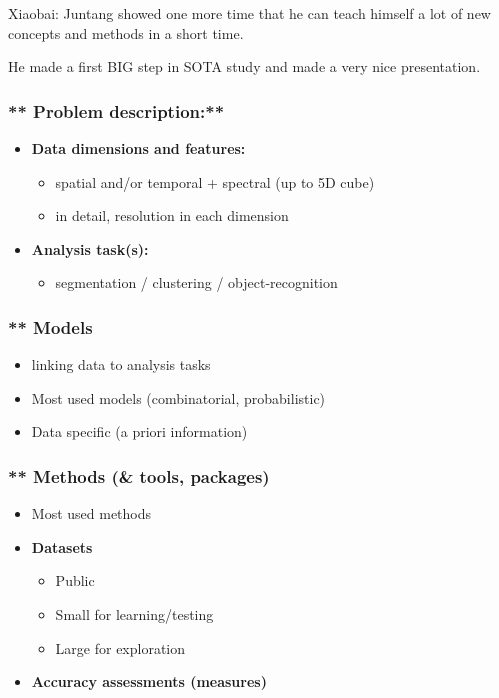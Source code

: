 


Xiaobai: Juntang showed one more time that he can teach himself a lot of new concepts and methods in a short time.

He made a first BIG step in SOTA study and made a very nice presentation.

\subsubsection*{** Problem description:**}
\begin{itemize}
    \item \textbf{Data dimensions and features:}
    \begin{itemize}
        \item spatial and/or temporal + spectral (up to 5D cube)
        \item in detail, resolution in each dimension
    \end{itemize}
    \item \textbf{Analysis task(s):}
    \begin{itemize}
        \item segmentation / clustering / object-recognition
    \end{itemize}
\end{itemize}

\subsubsection*{** Models}
\begin{itemize}
    \item linking data to analysis tasks
    \item Most used models (combinatorial, probabilistic)
    \item Data specific (a priori information)
\end{itemize}

\subsubsection*{** Methods (\& tools, packages)}
\begin{itemize}
    \item Most used methods
    \item \textbf{Datasets}
    \begin{itemize}
        \item Public
        \item Small for learning/testing
        \item Large for exploration
    \end{itemize}
    \item \textbf{Accuracy assessments (measures)}
\end{itemize}

\newpage